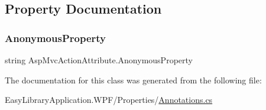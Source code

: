 \subsection{Property Documentation}
\mbox{\label{class_asp_mvc_action_attribute_a7068fa64becd1bc3de4622e5a50b0a49}} 
\subsubsection{\texorpdfstring{Anonymous\+Property}{AnonymousProperty}}
{\footnotesize\ttfamily string Asp\+Mvc\+Action\+Attribute.\+Anonymous\+Property\hspace{0.3cm}{\ttfamily [get]}}



The documentation for this class was generated from the following file\+:\begin{DoxyCompactItemize}
\item 
Easy\+Library\+Application.\+W\+P\+F/\+Properties/\mbox{\hyperlink{_annotations_8cs}{Annotations.\+cs}}\end{DoxyCompactItemize}
